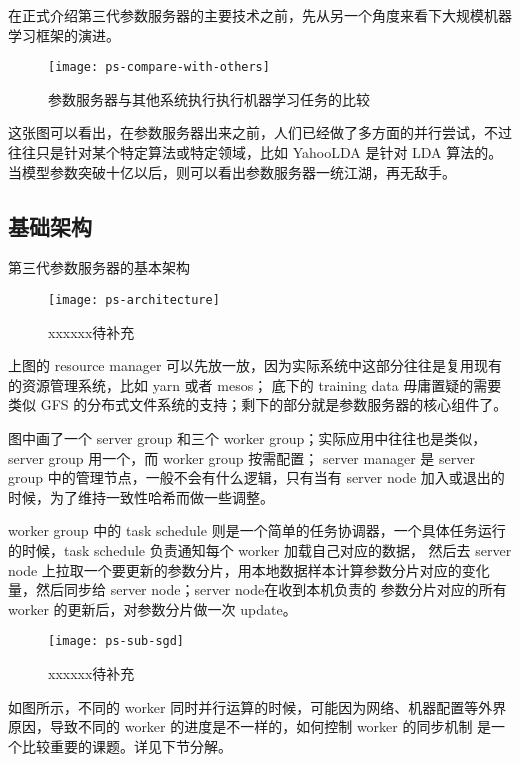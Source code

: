在正式介绍第三代参数服务器的主要技术之前，先从另一个角度来看下大规模机器学习框架的演进。
 
\begin{figure}[hbtp]
\centering
\texttt{[image: ps-compare-with-others]}
\caption{参数服务器与其他系统执行执行机器学习任务的比较}
\label{fig:ps-compare-with-others}
\end{figure}

这张图可以看出，在参数服务器出来之前，人们已经做了多方面的并行尝试，不过往往只是针对某个特定算法或特定领域，比如 YahooLDA 是针对 LDA 算法的。
当模型参数突破十亿以后，则可以看出参数服务器一统江湖，再无敌手。

\subsection{基础架构}\label{subsec:ps-architecture}

第三代参数服务器的基本架构

\begin{figure}[hbtp]
\centering
\texttt{[image: ps-architecture]}
\caption{xxxxxx待补充}
\end{figure}

上图的 resource manager 可以先放一放，因为实际系统中这部分往往是复用现有的资源管理系统，比如 yarn 或者 mesos；
底下的 training data 毋庸置疑的需要类似 GFS 的分布式文件系统的支持；剩下的部分就是参数服务器的核心组件了。

图中画了一个 server group 和三个 worker group；实际应用中往往也是类似，server group 用一个，而 worker group 按需配置；
server manager 是 server group 中的管理节点，一般不会有什么逻辑，只有当有 server node 加入或退出的时候，为了维持一致性哈希而做一些调整。

worker group 中的 task schedule 则是一个简单的任务协调器，一个具体任务运行的时候，task schedule 负责通知每个 worker 加载自己对应的数据，
然后去 server node 上拉取一个要更新的参数分片，用本地数据样本计算参数分片对应的变化量，然后同步给 server node；server node在收到本机负责的
参数分片对应的所有 worker 的更新后，对参数分片做一次 update。

\begin{figure}[hbtp]
\centering
\texttt{[image: ps-sub-sgd]}
\caption{xxxxxx待补充}
\end{figure}

如图所示，不同的 worker 同时并行运算的时候，可能因为网络、机器配置等外界原因，导致不同的 worker 的进度是不一样的，如何控制 worker 的同步机制
是一个比较重要的课题。详见下节分解。


